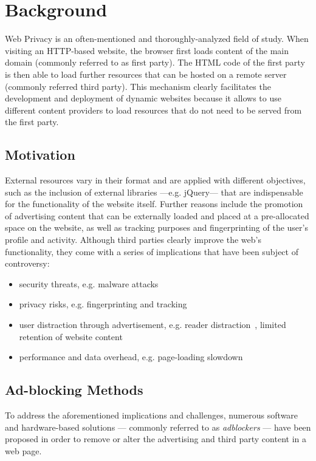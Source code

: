 \chapter{Background}
\label{sec:background}
Web Privacy is an often-mentioned and thoroughly-analyzed field of study. When visiting an HTTP-based website, the browser first loads content of the main domain (commonly referred to as first party). The HTML code of the first party is then able to load further resources that can be hosted on a remote server (commonly referred third party). This mechanism clearly facilitates the development and deployment of dynamic websites because it allows to use different content providers to load resources that do not need to be served from the first party.

\section{Motivation}
External resources vary in their format and are applied with different objectives, such as the inclusion of external libraries ---e.g. jQuery--- that are indispensable for the functionality of the website itself. Further reasons include the promotion of advertising content that can be externally loaded and placed at a pre-allocated space on the website, as well as tracking purposes and fingerprinting of the user's profile and activity. Although third parties clearly improve the web's functionality, they come with a series of implications that have been subject of controversy:
\begin{itemize}
 \item security threats, e.g. malware attacks~\cite{cisco_annual_security_report}
 \item privacy risks, e.g. fingerprinting and tracking~\cite{englehardt, krishnamurthy_privacy_diffusion, nikiforakis, soltani}
 \item user distraction through advertisement, e.g. reader distraction~\cite{beymerl}, limited retention of website content~\cite{mccoy}
 \item performance and data overhead, e.g. page-loading slowdown~\cite{krishnamurthy}
\end{itemize}

\section{Ad-blocking Methods}

To address the aforementioned implications and challenges, numerous software and hardware-based solutions --- commonly referred to as \textit{adblockers} --- have been proposed in order to remove or alter the advertising and third party content in a web page.

